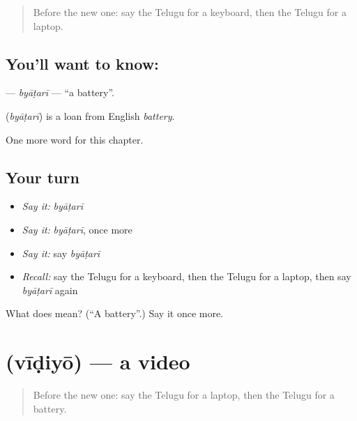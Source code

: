 \label{lesson:TE-C305-byatari}



\begin{quote}
Before the new one: say the Telugu for a keyboard, then the Telugu for a laptop.
\end{quote}

\subsection*{You'll want to know: }
\textbf{} — \emph{byāṭarī} — \textquotedblleft{}a battery\textquotedblright{}.

\begin{cousinweb}
\textbf{} (\emph{byāṭarī}) is a loan from English \emph{battery}.
\end{cousinweb}

\begin{grammarlens}[title={What you've built}]
One more word for this chapter.
\end{grammarlens}

\subsection*{Your turn}
\begin{itemize}
\raggedright
  \item \emph{Say it:} \emph{byāṭarī}
  \item \emph{Say it:} \emph{byāṭarī}, once more
  \item \emph{Say it:} say \emph{byāṭarī}
  \item \emph{Recall:} say the Telugu for a keyboard, then the Telugu for a laptop, then say \emph{byāṭarī} again
\end{itemize}

\begin{tcolorbox}[breakable,colback=teal!4,colframe=teal!35!black,title={Before you move on}]
What does  mean? (\textquotedblleft{}A battery\textquotedblright{}.) Say it once more.
\end{tcolorbox}
\section[\texorpdfstring{\te{వీడియో} (vīḍiyō)}{వీడియో (vīḍiyō)}]{ (vīḍiyō) — a video}

\label{lesson:TE-C305-vidiyo}



\begin{quote}
Before the new one: say the Telugu for a laptop, then the Telugu for a battery.
\end{quote}

